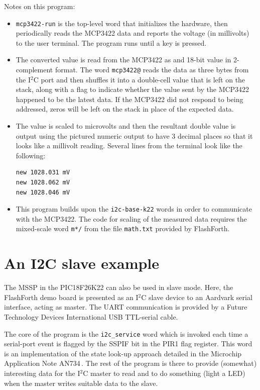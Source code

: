 \documentclass[12pt,a4paper]{article}
\begin{document}
\medskip
\noindent
Notes on this program:
\begin{itemize}
  \item \verb!mcp3422-run! is the top-level word that initializes the hardware, then periodically
    reads the MCP3422 data and reports the voltage (in millivolts) to the user terminal.
    The program runs until a key is pressed.
  \item The converted value is read from the MCP3422 as and 18-bit value in 2-complement format.
    The word \verb!mcp3422@! reads the data as three bytes from the I$^2$C port and then 
    shuffles it into a double-cell value that is left on the stack, along with a flag to indicate
    whether the value sent by the MCP3422 happened to be the latest data.
    If the MCP3422 did not respond to being addressed, zeros will be left on the stack in place
    of the expected data.
  \item The value is scaled to microvolts and then the resultant double value is output using the
    pictured numeric output to have 3 decimal places so that it looks like a millivolt reading.
    Several lines from the terminal look like the following:
    \begin{verbatim}
new 1028.031 mV 
new 1028.062 mV 
new 1028.046 mV 
    \end{verbatim}
  \item This program builds upon the \verb!i2c-base-k22! words
    in order to communicate with the MCP3422. 
    The code for scaling of the measured data requires 
    the mixed-scale word \verb!m*/! from the file \verb!math.txt! provided by FlashForth.
\end{itemize}


\newpage
\section{An I2C slave example}
%
The MSSP in the PIC18F26K22 can also be used in slave mode.
Here, the FlashForth demo board is presented as an I$^2$C slave device to
an Aardvark serial interface, acting as master.
The UART communication is provided by a Future Technology Devices International
USB TTL-serial cable.


\medskip\noindent
The core of the program is the \texttt{i2c\_service} word which is invoked
each time a serial-port event is flagged by the SSPIF bit in the PIR1 flag register.
This word is an implementation of the state look-up approach detailed in 
the Microchip Application Note AN734\,\cite{bowling_raj_2008a}.
The rest of the program is there to provide (somewhat) interesting data 
for the I$^2$C master to read and to do something (light a LED)
when the master writes suitable data to the slave.
\end{document}
